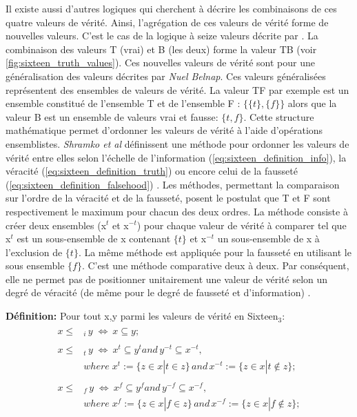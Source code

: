 \begin{refsegment}
    Il existe aussi d’autres logiques qui cherchent à décrire les combinaisons de ces quatre valeurs de vérité. Ainsi, l’agrégation de ces valeurs de vérité forme de nouvelles valeurs. C’est le cas de la logique à seize valeurs décrite par \citeauthor{shramko2005some} \cite{shramko2005some,shramko2011truth,shramko2006hyper}. La combinaison des valeurs T (vrai) et B (les deux) forme la valeur TB (voir \cref{fig:sixteen_truth_values}). Ces nouvelles valeurs de vérité sont pour \citeauthor{shramko2005some} une généralisation des valeurs décrites par \textit{Nuel Belnap}. Ces valeurs généralisées représentent des ensembles de valeurs de vérité. La valeur TF par exemple est un ensemble constitué de l'ensemble T et de l'ensemble F : $\{\{t\},\{f\}\}$ alors que la valeur B est un ensemble de valeurs vrai et fausse: $\{t,f\}$. Cette structure mathématique permet d'ordonner les valeurs de vérité à l'aide d'opérations ensemblistes. \textit{Shramko et al} définissent une méthode pour ordonner les valeurs de vérité entre elles selon l'échelle de l'information (\ref{eq:sixteen_definition_info}), la véracité (\ref{eq:sixteen_definition_truth}) ou encore celui de la fausseté (\ref{eq:sixteen_definition_falsehood}) . Les méthodes, permettant la comparaison sur l'ordre de la véracité et de la fausseté, posent le postulat que T et F sont respectivement le maximum pour chacun des deux ordres. La méthode consiste à créer deux ensembles (x$^{t}$ et x$^{-t}$) pour chaque valeur de vérité à comparer tel que x$^{t}$ est un sous-ensemble de x contenant $\{t\}$ et x$^{-t}$ un sous-ensemble de x à l'exclusion de $\{t\}$. La même méthode est appliquée pour la fausseté en utilisant le sous ensemble $\{f\}$.  C'est une méthode comparative deux à deux. Par conséquent, elle ne permet pas de positionner unitairement une valeur de vérité selon un degré de véracité (de même pour le degré de fausseté et d'information) .
    
    \textbf{Définition:} Pour tout x,y parmi les valeurs de vérité en Sixteen$_{3}$:\nolisttopbreak \vspace{-0.5cm}
    \begin{align}
        \begin{split}
        x \leq& _{i} \, y \; \iff \: x \subseteq y\label{eq:sixteen_definition_info};
        \end{split}\\ \begin{split}\label{eq:sixteen_definition_truth}
        x \leq& _{t} \, y \; \iff \: x^{t} \subseteq y^{t} and \, y^{-t} \subseteq x^{-t},\\
              &where \; x^{t} := \{z \in x | t \in z \} \, and \, x^{-t} := \{z \in x | t \notin z \};
        \end{split}\\ \begin{split}\label{eq:sixteen_definition_falsehood}
        x \leq& _{f} \, y \; \iff \: x^{f} \subseteq y^{f} and \, y^{-f} \subseteq x^{-f},\\
              &where \; x^{f} := \{z \in x | f \in z \} \, and \, x^{-f} := \{z \in x | f \notin z \};
        \end{split}
    \end{align}
    

\end{refsegment}
